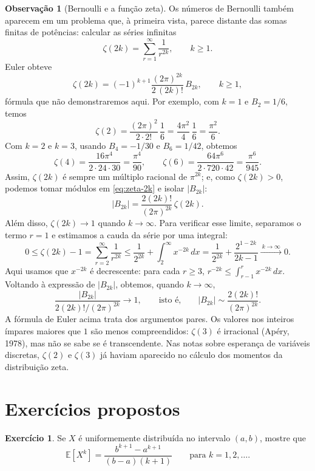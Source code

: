 \documentclass[12pt,portuguese]{article}
\theoremstyle{definition}
\newtheorem{remark}[remark]{Observação}
\theoremstyle{plainexercise}
\newtheorem{exercise}{Exercício}
\theoremstyle{starredexercise}
\theoremstyle{definition}
\begin{document}
\begin{remark}[Bernoulli e a função zeta]\label{rem:bernoulli-zeta}
Os números de Bernoulli também aparecem em um problema que, à primeira
vista, parece distante das somas finitas de potências: calcular as
séries infinitas
\[
\zeta(2k)=\sum_{r=1}^{\infty}\frac1{r^{2k}},\qquad k\geqslant1.
\]
Euler obteve
\begin{equation}\label{eq:zeta-2k}
\zeta(2k)=(-1)^{k+1}\frac{(2\pi)^{2k}}{2\,(2k)!}\,B_{2k},
\qquad k\geqslant1,
\end{equation}
fórmula que não demonstraremos aqui. Por exemplo, com $k=1$ e
$B_2=1/6$, temos
\[
\zeta(2)=\frac{(2\pi)^2}{2\cdot2!}\,\frac16
=\frac{4\pi^2}{4}\,\frac16=\frac{\pi^2}{6}.
\]
Com $k=2$ e $k=3$, usando $B_4=-1/30$ e $B_6=1/42$, obtemos
\[
\zeta(4)=\frac{16\pi^4}{2\cdot24\cdot30}=\frac{\pi^4}{90},
\qquad
\zeta(6)=\frac{64\pi^6}{2\cdot720\cdot42}=\frac{\pi^6}{945}.
\]
Assim, $\zeta(2k)$ é sempre um múltiplo racional de $\pi^{2k}$; e, como
$\zeta(2k)>0$, podemos tomar módulos em \eqref{eq:zeta-2k} e isolar
$|B_{2k}|$:
\[
|B_{2k}|=\frac{2(2k)!}{(2\pi)^{2k}}\,\zeta(2k).
\]
Além disso, $\zeta(2k)\to1$ quando $k\to\infty$.
Para verificar esse limite, separamos o
termo $r=1$ e estimamos a cauda da série por uma integral:
\[
0\leqslant\zeta(2k)-1
=\sum_{r=2}^{\infty}\frac1{r^{2k}}
\leqslant\frac1{2^{2k}}+\int_2^\infty x^{-2k}\,dx
=\frac1{2^{2k}}+\frac{2^{1-2k}}{2k-1}
\xrightarrow{\ k\to\infty\ }0.
\]
Aqui usamos que $x^{-2k}$ é decrescente: para cada $r\geqslant3$,
$r^{-2k}\leqslant\int_{r-1}^r x^{-2k}\,dx$.
Voltando à expressão de $|B_{2k}|$, obtemos, quando $k\to\infty$,
\[
\frac{|B_{2k}|}{2(2k)!/(2\pi)^{2k}}\longrightarrow1,
\qquad\text{isto é,}\qquad
|B_{2k}|\sim\frac{2(2k)!}{(2\pi)^{2k}}.
\]
A fórmula de Euler acima trata dos argumentos pares. Os valores nos
inteiros ímpares maiores que $1$ são menos compreendidos: $\zeta(3)$ é
irracional (Apéry, 1978), mas não se sabe se é transcendente.
Nas notas sobre esperança de variáveis discretas, $\zeta(2)$
e $\zeta(3)$ já haviam aparecido no cálculo dos momentos da distribuição
zeta.
\end{remark}

\section{Exercícios propostos}\label{sec:exercicios-momentos}

\begin{exercise}\label{exercise:gw-7-10}
  Se $X$ é uniformemente distribuída no intervalo $(a,b)$, mostre que
  \[
    \mathbb{E}[X^k] = \frac{b^{k+1} - a^{k+1}}{(b-a)(k+1)}
    \qquad \text{para } k = 1, 2, \ldots.
  \]
\end{exercise}
\end{document}
